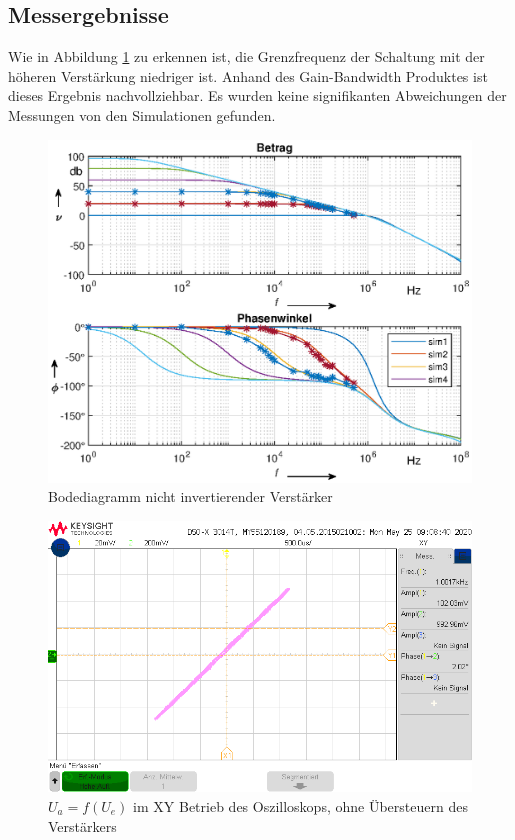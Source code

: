 \subsection{Messergebnisse}
Wie in Abbildung \ref{fig:bode_niinv} zu erkennen ist, die Grenzfrequenz der Schaltung mit der höheren Verstärkung niedriger ist. Anhand des Gain-Bandwidth Produktes ist dieses Ergebnis nachvollziehbar. Es wurden keine signifikanten Abweichungen der Messungen von den Simulationen gefunden. 
\begin{figure}[H]
    \centering
    \includegraphics[width=\costumPicWidth]{Lab_1/Plots/niinv_verst.eps}
    \caption{Bodediagramm nicht invertierender Verstärker}
    \label{fig:bode_niinv}
\end{figure}

\begin{figure}[H]
    \centering
    \includegraphics[width=\costumPicWidth]{Lab_1/Messungen/niinv_verst/xy_ohne_uebersteuern_1.png}
    \caption{$U_a = f(U_e)$ im XY Betrieb des Oszilloskops, ohne Übersteuern des Verstärkers }
    \label{fig:niinv_ohne_Uebersteuern}
\end{figure}

